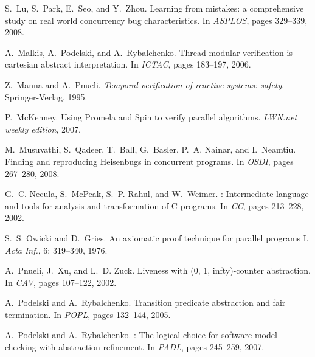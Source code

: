 \documentclass{sigplanconf}
\begin{document}
\begin{thebibliography}{34}
S.~Lu, S.~Park, E.~Seo, and Y.~Zhou.
\newblock Learning from mistakes: a comprehensive study on real world
  concurrency bug characteristics.
\newblock In \emph{ASPLOS}, pages 329--339, 2008.

A.~Malkis, A.~Podelski, and A.~Rybalchenko.
\newblock Thread-modular verification is cartesian abstract interpretation.
\newblock In \emph{ICTAC}, pages 183--197, 2006.

Z.~Manna and A.~Pnueli.
\newblock \emph{Temporal verification of reactive systems: safety}.
\newblock Springer-Verlag, 1995.

P.~McKenney.
\newblock Using {Promela} and {Spin} to verify parallel algorithms.
\newblock \emph{LWN.net weekly edition}, 2007.

M.~Musuvathi, S.~Qadeer, T.~Ball, G.~Basler, P.~A. Nainar, and I.~Neamtiu.
\newblock Finding and reproducing {Heisenbugs} in concurrent programs.
\newblock In \emph{OSDI}, pages 267--280, 2008.

G.~C. Necula, S.~McPeak, S.~P. Rahul, and W.~Weimer.
: Intermediate language and tools for analysis and
  transformation of {C} programs.
\newblock In \emph{CC}, pages 213--228, 2002.

S.~S. Owicki and D.~Gries.
\newblock An axiomatic proof technique for parallel programs {I}.
\newblock \emph{Acta Inf.}, 6: 319--340, 1976.

A.~Pnueli, J.~Xu, and L.~D. Zuck.
\newblock Liveness with (0, 1, infty)-counter abstraction.
\newblock In \emph{CAV}, pages 107--122, 2002.

A.~Podelski and A.~Rybalchenko.
\newblock Transition predicate abstraction and fair termination.
\newblock In \emph{POPL}, pages 132--144, 2005.

A.~Podelski and A.~Rybalchenko.
: The logical choice for software model checking with
  abstraction refinement.
\newblock In \emph{PADL}, pages 245--259, 2007.


\end{thebibliography}
\end{document}
